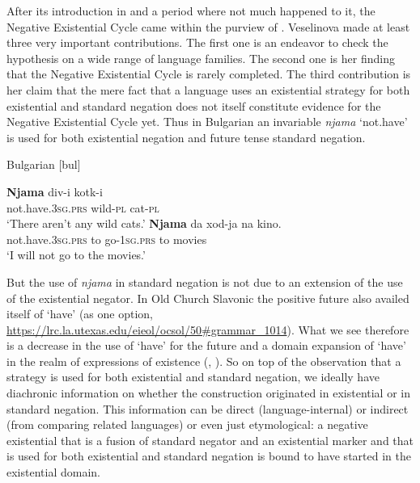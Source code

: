 ﻿\documentclass[output=paper,draft,draftmode,colorlinks,citecolor=brown]{langscibook}
\begin{document}
After its introduction in \citet{Croft1991} and a period where not much
happened to it, the Negative Existential Cycle came within the purview of
\textcites{Veselinova2010}{Veselinova2013}{Veselinova2014}{Veselinova2015}{Veselinova2016}. Veselinova made at least three
very important contributions. The first one is an endeavor to check the
hypothesis on a wide range of language families. The second one is her
finding that the Negative Existential Cycle is rarely completed. The third
contribution is her claim that the mere fact that a language uses an
existential strategy for both existential and standard negation does not
itself constitute evidence for the Negative Existential Cycle yet. Thus in
Bulgarian an invariable \textit{njama} `not.have' is used for both
existential negation and future tense standard negation.
%
\begin{exe}\ex\label{ex:int-bulgarian-cats-movies}
Bulgarian [bul] \parencites(Indo-European;)()[1333]{Veselinova2014}[204]{Veselinova2010}
\begin{xlist}
    \ex\gll \textbf{Njama}      div-i     kotk-i \\
not.have.\textsc{3sg.prs}  wild-\textsc{pl}   cat-\textsc{pl} \\
    \glt `There aren’t any wild cats.'
    \ex\gll \textbf{Njama}      da  xod-ja    na  kino.\\
not.have.\textsc{3sg.prs}  to  go-1\textsc{sg.prs}  to  movies\\
    \glt `I will not go to the movies.'
    \end{xlist}\end{exe}
%
But the use of \textit{njama} in standard negation is not due to an
extension of the use of the existential negator. In Old Church Slavonic the
positive future also availed itself of `have'
(as one option,
\href{https://lrc.la.utexas.edu/eieol/ocsol/50#grammar_1014}{https://lrc.la.utexas.edu/eieol/ocsol/50\#grammar\_1014})\nocite{OCS}. What we see
therefore is a decrease in the use of `have' for the future and a domain
expansion of `have' in the realm of expressions of existence
(\citealt[203--204]{Veselinova2010}, \cites(but compare )()[1336--1337]{Veselinova2014}
[157]{Veselinova2016}). So on top of the observation that a strategy is used
for both existential and standard negation, we ideally have diachronic
information on whether the construction originated in existential or in
standard negation. This information can be direct (language-internal) or
indirect (from comparing related languages) or even just etymological: a
negative existential that is a fusion of standard negator and an
existential marker and that is used for both existential and standard
negation is bound to have started in the existential domain.
\end{document}

